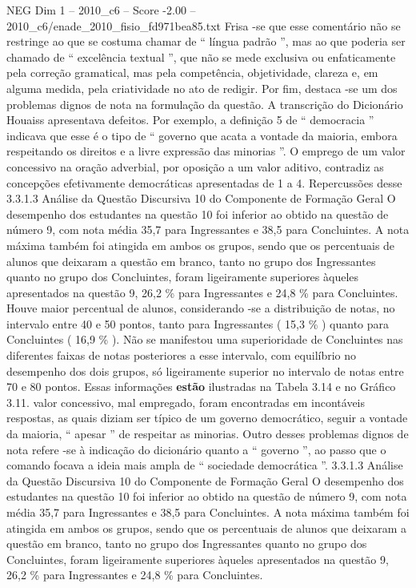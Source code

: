 \begin{textsample}{NEG Dim 1 – 2010\_c6 – Score -2.00 – 2010\_c6/enade\_2010\_fisio\_fd971bea85.txt}
Frisa -se que esse comentário não se restringe ao que se costuma chamar de “ língua padrão ”, mas ao que poderia ser chamado de “ excelência textual ”, que não se mede exclusiva ou enfaticamente pela correção gramatical, mas pela competência, objetividade, clareza e, em alguma medida, pela criatividade no ato de redigir.
Por fim, destaca -se um dos problemas dignos de nota na formulação da questão.
A transcrição do Dicionário Houaiss apresentava defeitos.
Por exemplo, a definição 5 de “ democracia ” indicava que esse é o tipo de “ governo que acata a vontade da maioria, embora respeitando os direitos e a livre expressão das minorias ”.
O emprego de um valor concessivo na oração adverbial, por oposição a um valor aditivo, contradiz as concepções efetivamente democráticas apresentadas de 1 a 4.
Repercussões desse 3.3.1.3 Análise da Questão Discursiva 10 do Componente de Formação Geral O desempenho dos estudantes na questão 10 foi inferior ao obtido na questão de número 9, com nota média 35,7 para Ingressantes e 38,5 para Concluintes.
A nota máxima também foi atingida em ambos os grupos, sendo que os percentuais de alunos que deixaram a questão em branco, tanto no grupo dos Ingressantes quanto no grupo dos Concluintes, foram ligeiramente superiores àqueles apresentados na questão 9, 26,2 \% para Ingressantes e 24,8 \% para Concluintes.
Houve maior percentual de alunos, considerando -se a distribuição de notas, no intervalo entre 40 e 50 pontos, tanto para Ingressantes ( 15,3 \% ) quanto para Concluintes ( 16,9 \% ).
Não se manifestou uma superioridade de Concluintes nas diferentes faixas de notas posteriores a esse intervalo, com equilíbrio no desempenho dos dois grupos, só ligeiramente superior no intervalo de notas entre 70 e 80 pontos.
Essas informações \textbf{estão} ilustradas na Tabela 3.14 e no Gráfico 3.11. valor concessivo, mal empregado, foram encontradas em incontáveis respostas, as quais diziam ser típico de um governo democrático, seguir a vontade da maioria, “ apesar ” de respeitar as minorias.
Outro desses problemas dignos de nota refere -se à indicação do dicionário quanto a “ governo ”, ao passo que o comando focava a ideia mais ampla de “ sociedade democrática ”. 3.3.1.3 Análise da Questão Discursiva 10 do Componente de Formação Geral O desempenho dos estudantes na questão 10 foi inferior ao obtido na questão de número 9, com nota média 35,7 para Ingressantes e 38,5 para Concluintes.
A nota máxima também foi atingida em ambos os grupos, sendo que os percentuais de alunos que deixaram a questão em branco, tanto no grupo dos Ingressantes quanto no grupo dos Concluintes, foram ligeiramente superiores àqueles apresentados na questão 9, 26,2 \% para Ingressantes e 24,8 \% para Concluintes.

\end{textsample}
